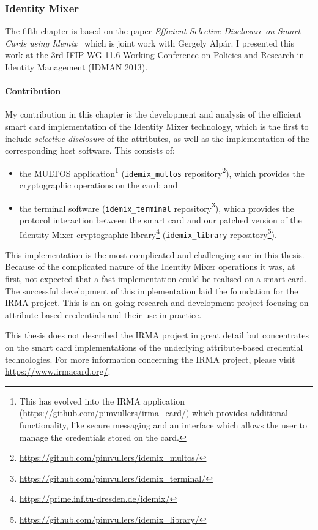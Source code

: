 \subsubsection{Identity Mixer}

The fifth chapter is based on the paper \emph{Efficient Selective Disclosure on
Smart Cards using Idemix}~\cite{VullersAlpar2013} which is joint work with
Gergely Alp\'ar. I presented this work at the 3rd IFIP WG 11.6 Working
Conference on Policies and Research in Identity Management (IDMAN 2013).

\paragraph{Contribution}

My contribution in this chapter is the development and analysis of the efficient
smart card implementation of the Identity Mixer technology, which is the first
to include \emph{selective disclosure} of the attributes, as well as the
implementation of the corresponding host software. This consists of:
\begin{itemize}
  \item the MULTOS application\footnote{This has evolved into the IRMA
    application (\url{https://github.com/pimvullers/irma_card/}) which provides
    additional functionality, like secure messaging and an interface which
    allows the user to manage the credentials stored on the card.}
    (\texttt{idemix\_multos} repository\footnote{%
    \url{https://github.com/pimvullers/idemix_multos/}}), which provides the
    cryptographic operations on the card; and
  \item the terminal software (\texttt{idemix\_terminal} repository\footnote{%
    \url{https://github.com/pimvullers/idemix_terminal/}}), which provides the
    protocol interaction between the smart card and our patched version of the
    Identity Mixer cryptographic
    library\footnote{\url{https://prime.inf.tu-dresden.de/idemix/}}
    (\texttt{idemix\_library} repository\footnote{%
    \url{https://github.com/pimvullers/idemix_library/}}).
\end{itemize}

This implementation is the most complicated and challenging one in this thesis.
Because of the complicated nature of the Identity Mixer operations it was, at
first, not expected that a fast implementation could be realised on a smart
card. The successful development of this implementation laid the foundation for
the IRMA project. This is an on-going research and development project focusing
on attribute-based credentials and their use in practice.

This thesis does not described the IRMA project in great detail but concentrates
on the smart card implementations of the underlying attribute-based credential
technologies. For more information concerning the IRMA project, please visit
\url{https://www.irmacard.org/}.
